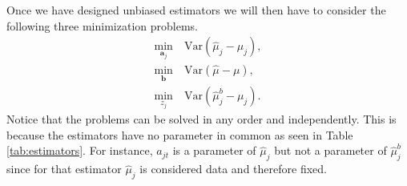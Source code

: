 \documentclass[11pt]{article}
\theoremstyle{definition}
\begin{document}
Once we have designed unbiased estimators we will then have to consider the following three minimization problems.
\begin{align}
    \underset{\bm a_j}{\min} &\:\text{Var}(\hat\mu_j - \mu_j),\label{eq:best_a}\\
    \underset{\bm b}{\min} &\:\text{Var}(\hat\mu - \mu), \label{eq:best_b}\\
    \underset{z_j}{\min} &\:\text{Var}(\hat\mu_j^b - \mu_j). \label{eq:best_z}
\end{align}
Notice that the problems can be solved in any order and independently. This is because the estimators have no parameter in common as seen in Table \ref{tab:estimators}. For instance, $a_{jt}$ is a parameter of $\hat\mu_j$ but not a parameter of $\hat\mu_j^b$ since for that estimator $\hat\mu_j$ is considered data and therefore fixed.
\end{document}
